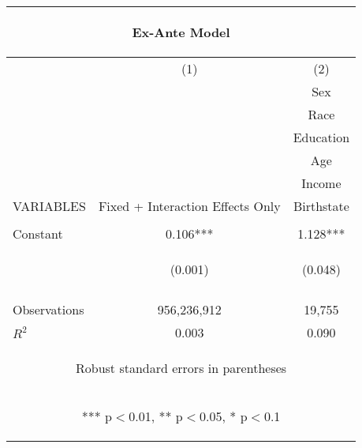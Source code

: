 \documentclass[]{article}
\begin{document}
\begin{center}
\begin{tabular}{lcc}
\multicolumn{3}{c}{\begin{large}Ex-Ante Model\end{large}} \\ \hline
 & (1) & (2) \\
 &  & Sex \\
 &  & Race \\
 &  & Education \\
 &  & Age \\
 &  & Income \\
VARIABLES & Fixed + Interaction Effects Only & Birthstate \\ \hline
\vspace{4pt} & \begin{footnotesize}\end{footnotesize} & \begin{footnotesize}\end{footnotesize} \\
Constant & 0.106*** & 1.128*** \\
 & \begin{footnotesize}(0.001)\end{footnotesize} & \begin{footnotesize}(0.048)\end{footnotesize} \\
\vspace{4pt} & \begin{footnotesize}\end{footnotesize} & \begin{footnotesize}\end{footnotesize} \\
Observations & 956,236,912 & 19,755 \\
 $R^2$ & 0.003 & 0.090 \\ \hline
\multicolumn{3}{c}{\begin{footnotesize} Robust standard errors in parentheses\end{footnotesize}} \\
\multicolumn{3}{c}{\begin{footnotesize} *** p$<$0.01, ** p$<$0.05, * p$<$0.1\end{footnotesize}} \\
\end{tabular}
\end{center}
\end{document}
